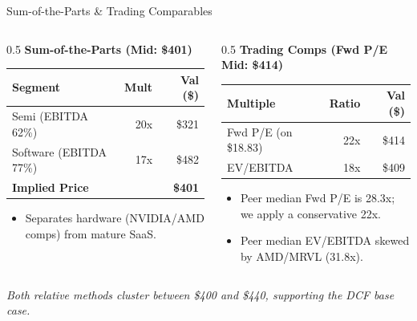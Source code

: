\documentclass[aspectratio=169,10pt]{beamer}
\begin{document}
\begin{frame}{Sum-of-the-Parts \& Trading Comparables}
  \begin{columns}[T]
    \begin{column}{0.5\textwidth}
      \textbf{Sum-of-the-Parts (Mid: \$401)}
      \vspace{0.2cm}
      
      \small
      \begin{tabularx}{\textwidth}{@{}X r r@{}}
        \toprule
        \textbf{Segment} & \textbf{Mult} & \textbf{Val (\$)} \\
        \midrule
        Semi (EBITDA 62\%) & 20x & \$321 \\
        Software (EBITDA 77\%) & 17x & \$482 \\
        \midrule
        \textbf{Implied Price} & & \textbf{\$401} \\
        \bottomrule
      \end{tabularx}
      \vspace{0.4cm}
      \begin{itemize}
          \item Separates hardware (NVIDIA/AMD comps) from mature SaaS.
      \end{itemize}
    \end{column}
    \begin{column}{0.5\textwidth}
      \textbf{Trading Comps (Fwd P/E Mid: \$414)}
      \vspace{0.2cm}
      
      \small
      \begin{tabularx}{\textwidth}{@{}X r r@{}}
        \toprule
        \textbf{Multiple} & \textbf{Ratio} & \textbf{Val (\$)} \\
        \midrule
        Fwd P/E (on \$18.83) & 22x & \$414 \\
        EV/EBITDA & 18x & \$409 \\
        \bottomrule
      \end{tabularx}
      \vspace{0.4cm}
      \begin{itemize}
          \item Peer median Fwd P/E is 28.3x; we apply a conservative 22x.
          \item Peer median EV/EBITDA skewed by AMD/MRVL (31.8x).
      \end{itemize}
    \end{column}
  \end{columns}
  \vspace{0.8cm}
  \begin{center}
      \textit{Both relative methods cluster between \$400 and \$440, supporting the DCF base case.}
  \end{center}
\end{frame}
\end{document}
